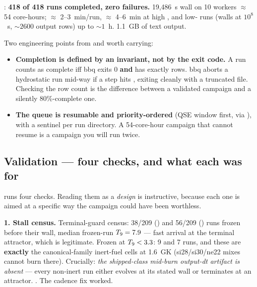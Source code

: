 : \textbf{418 of 418 runs completed, zero failures.}
19,486~s wall on 10 workers $\approx$ 54 core-hours;  $\approx$
2--3~min/run,  $\approx$ 4--6~min at high \Tn, and low-\Tn{} runs
(walls at $10^{8}$~s, ${\sim}2600$ output rows) up to ${\sim}1$~h. 1.1~GB of
text output.

Two engineering points from  and
 worth carrying:

\begin{itemize}
\item \textbf{Completion is defined by an invariant, not by the exit code.} A
  run counts as complete iff bbq exits 0 \textbf{and}  has
  exactly  rows. bbq aborts a hydrostatic run mid-way if a
  step hits , exiting cleanly with a truncated file. Checking
  the row count is the difference between a validated campaign and a silently
  80\%-complete one.
\item \textbf{The queue is resumable and priority-ordered} (QSE window first,
  via ), with a
   sentinel per run directory. A 54-core-hour campaign that cannot
  resume is a campaign you will run twice.
\end{itemize}

\subsection{Validation --- four checks, and what each was for}
\label{sec:validation}

 runs four checks. Reading them as a \emph{design}
is instructive, because each one is aimed at a specific way the campaign could
have been worthless.

\textbf{1. Stall census.} Terminal-guard census: 38/209 () and 56/209
() runs frozen before their wall, median frozen-run $T_{9} = 7.9$ ---
fast arrival at the terminal attractor, which is legitimate. Frozen at
$T_{9} < 3.3$: 9 and 7 runs, and these are \textbf{exactly} the canonical-family
inert-fuel cells at 1.6~GK (si28/si30/ne22 mixes cannot burn there).
Crucially: \emph{the shipped-class mid-burn output-dt artifact is absent} ---
every non-inert run either evolves at its stated wall or terminates at an
attractor. . The cadence fix worked.

